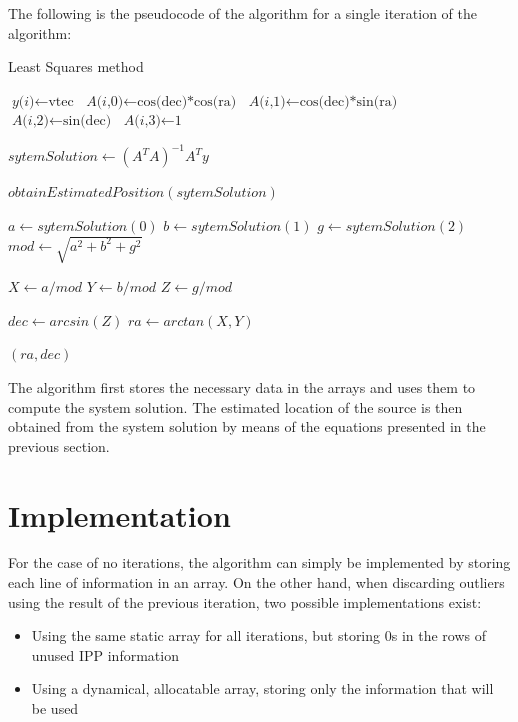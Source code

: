 The following is the pseudocode of the algorithm for a single iteration of the algorithm:

\clearpage
\begin{algorithm}
	\caption{Least Squares method}\label{leastSquaresPseudo}
	\begin{algorithmic}[1]
		
		\State $\textit{y(i)} \gets \text{vtec}$
		\State $\textit{A(i,0)} \gets \text{cos(dec)*cos(ra)}$
		\State $\textit{A(i,1)} \gets \text{cos(dec)*sin(ra)}$
		\State $\textit{A(i,2)} \gets \text{sin(dec)}$
		\State $\textit{A(i,3)} \gets \text{1}$
		\EndFor
		
		\State $\textit{sytemSolution} \gets (A^{T}A)^{-1}A^{T}y$
		
		\Return $obtainEstimatedPosition(sytemSolution)$
		\EndProcedure

			\State $\textit{a} \gets sytemSolution(0)$
			\State $\textit{b} \gets sytemSolution(1)$
			\State $\textit{g} \gets sytemSolution(2)$
			\State $\textit{mod} \gets \sqrt{a^{2} + b^{2} + g^{2}}$ 
			
			
			\State $\textit{X} \gets a/mod$
			\State $\textit{Y} \gets b/mod$
			\State $\textit{Z} \gets g/mod$
			
			\State $\textit{dec} \gets arcsin(Z)$
			\State $\textit{ra} \gets arctan(X,Y)$
			
			\Return $(ra, dec)$
		\EndProcedure
	\end{algorithmic}
\end{algorithm}

The algorithm first stores the necessary data in the arrays and uses them to compute the system solution. The estimated location of the source is then obtained from the system solution by means of the equations presented in the previous section.

\section{Implementation}

For the case of no iterations, the algorithm can simply be implemented by storing each line of information in an array. On the other hand, when discarding outliers using the result of the previous iteration, two possible implementations exist:

\begin{itemize}
	\item Using the same static array for all iterations, but storing 0s in the rows of unused IPP information
	\item Using a dynamical, allocatable array, storing only the information that will be used
\end{itemize}


